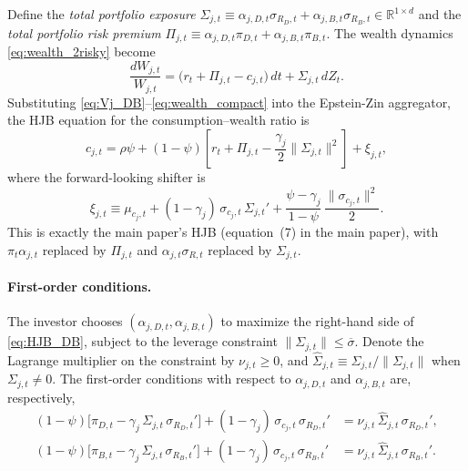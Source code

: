 \documentclass[11pt,english]{article}
\begin{document}
Define the \emph{total portfolio exposure} $\Sigma_{j,t}\equiv\alpha_{j,D,t}\sigma_{R_D,t}+\alpha_{j,B,t}\sigma_{R_B,t}\in\mathbb{R}^{1\times d}$ and the \emph{total portfolio risk premium} $\Pi_{j,t}\equiv\alpha_{j,D,t}\pi_{D,t}+\alpha_{j,B,t}\pi_{B,t}$. The wealth dynamics \eqref{eq:wealth_2risky} become
\begin{equation}\label{eq:wealth_compact}
    \frac{dW_{j,t}}{W_{j,t}} = \big(r_t + \Pi_{j,t} - c_{j,t}\big)\,dt + \Sigma_{j,t}\,dZ_t.
\end{equation}
Substituting \eqref{eq:Vj_DB}--\eqref{eq:wealth_compact} into the Epstein-Zin aggregator, the HJB equation for the consumption--wealth ratio is
\begin{equation}\label{eq:HJB_DB}
    c_{j,t} = \rho\psi + (1-\psi)\!\left[r_t + \Pi_{j,t} - \frac{\gamma_j}{2}\|\Sigma_{j,t}\|^2\right] + \xi_{j,t},
\end{equation}
where the forward-looking shifter is
\begin{equation}\label{eq:xi_DB}
    \xi_{j,t} \equiv \mu_{c_j,t} + (1-\gamma_j)\,\sigma_{c_j,t}\,\Sigma_{j,t}' + \frac{\psi-\gamma_j}{1-\psi}\,\frac{\|\sigma_{c_j,t}\|^2}{2}.
\end{equation}
This is exactly the main paper's HJB (equation~(7) in the main paper), with $\pi_t\alpha_{j,t}$ replaced by $\Pi_{j,t}$ and $\alpha_{j,t}\sigma_{R,t}$ replaced by $\Sigma_{j,t}$.

\paragraph{First-order conditions.}
The investor chooses $(\alpha_{j,D,t},\alpha_{j,B,t})$ to maximize the right-hand side of \eqref{eq:HJB_DB}, subject to the leverage constraint $\|\Sigma_{j,t}\|\le\overline{\sigma}$. Denote the Lagrange multiplier on the constraint by $\nu_{j,t}\ge 0$, and $\widehat{\Sigma}_{j,t}\equiv\Sigma_{j,t}/\|\Sigma_{j,t}\|$ when $\Sigma_{j,t}\neq 0$. The first-order conditions with respect to $\alpha_{j,D,t}$ and $\alpha_{j,B,t}$ are, respectively,
\begin{align}
    (1-\psi)\Big[\pi_{D,t} - \gamma_j\,\Sigma_{j,t}\,\sigma_{R_D,t}'\Big]
    + (1-\gamma_j)\,\sigma_{c_j,t}\,\sigma_{R_D,t}'
    &= \nu_{j,t}\,\widehat{\Sigma}_{j,t}\,\sigma_{R_D,t}', \label{eq:FOC_D}\\[4pt]
    (1-\psi)\Big[\pi_{B,t} - \gamma_j\,\Sigma_{j,t}\,\sigma_{R_B,t}'\Big]
    + (1-\gamma_j)\,\sigma_{c_j,t}\,\sigma_{R_B,t}'
    &= \nu_{j,t}\,\widehat{\Sigma}_{j,t}\,\sigma_{R_B,t}'. \label{eq:FOC_B}
\end{align}
\end{document}
